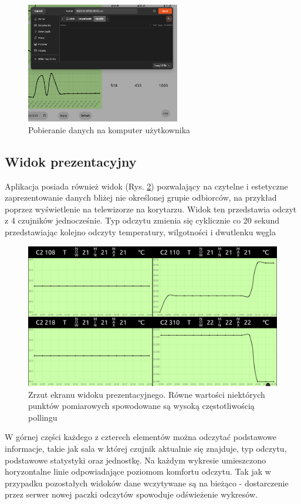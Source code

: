 \begin{figure}[H]
    \centering
    \includegraphics[width=0.6\textwidth]{zdj/app/download-csv.png}
    \caption{Pobieranie danych na komputer użytkownika}
    \label{csv-download}
\end{figure}

\subsection{Widok prezentacyjny}
Aplikacja posiada również widok (Rys. \ref{display-view}) pozwalający na czytelne i estetyczne zaprezentowanie danych bliżej nie określonej grupie odbiorców, na przykład poprzez wyświetlenie
na telewizorze na korytarzu.
Widok ten przedstawia odczyt z 4 czujników jednocześnie. Typ odczytu zmienia się cyklicznie co 20 sekund przedstawiając kolejno odczyty temperatury, wilgotności
i dwutlenku węgla

\begin{figure}[H]
    \includegraphics[width=\textwidth]{zdj/app/presentation-view.png}
    \caption{Zrzut ekranu widoku prezentacyjnego. Równe wartości niektórych punktów pomiarowych spowodowane
    są wysoką częstotliwością pollingu}
    \label{display-view}
\end{figure}

W górnej części każdego z czterech elementów można odczytać podstawowe informacje, takie jak sala w której czujnik aktualnie się znajduje, typ odczytu, podstawowe
statystyki oraz jednostkę. Na każdym wykresie umieszczono horyzontalne linie odpowiadające poziomom komfortu odczytu. Tak jak w przypadku pozostałych widoków
dane wczytywane są na bieżąco - dostarczenie przez serwer nowej paczki odczytów spowoduje odświeżenie wykresów.